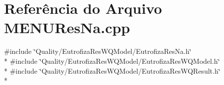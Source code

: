 \section{Referência do Arquivo M\+E\+N\+U\+Res\+Na.\+cpp}
\label{_m_e_n_u_res_na_8cpp}
{\ttfamily \#include \char`\"{}Quality/\+Eutrofiza\+Res\+W\+Q\+Model/\+Eutrofiza\+Res\+Na.\+h\char`\"{}}\\*
{\ttfamily \#include \char`\"{}Quality/\+Eutrofiza\+Res\+W\+Q\+Model/\+Eutrofiza\+Res\+W\+Q\+Model.\+h\char`\"{}}\\*
{\ttfamily \#include \char`\"{}Quality/\+Eutrofiza\+Res\+W\+Q\+Model/\+Eutrofiza\+Res\+W\+Q\+Result.\+h\char`\"{}}\\*
